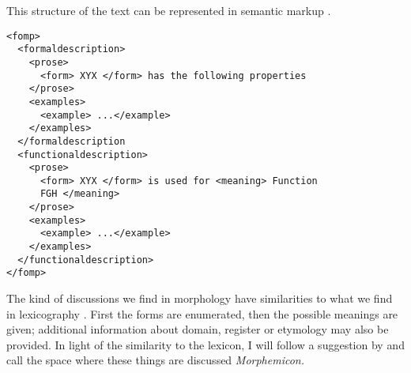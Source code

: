 This structure of the text can be represented in semantic markup .

\ea\label{xml:fofomp:functionalformal}
\begin{verbatim}
<fomp>
  <formaldescription>
    <prose>
      <form> XYX </form> has the following properties
    </prose>
    <examples>
      <example> ...</example>
    </examples>
  </formaldescription
  <functionaldescription>
    <prose>
      <form> XYX </form> is used for <meaning> Function
      FGH </meaning>
    </prose>
    <examples>
      <example> ...</example>
    </examples>
  </functionaldescription>
</fomp>
\end{verbatim}
\z


The kind of discussions we find in morphology have similarities to what we find in lexicography \citep{SchultzeBerndt1998,Mosel2006craft,Weber2006grow}. First the forms are enumerated, then the possible meanings are given; additional information about domain, register or etymology may also be provided. In light of the similarity to the lexicon, I will follow a suggestion by \citet{LehmannEtAl2004} and call the space where these things are discussed \em Morphemicon\em.

